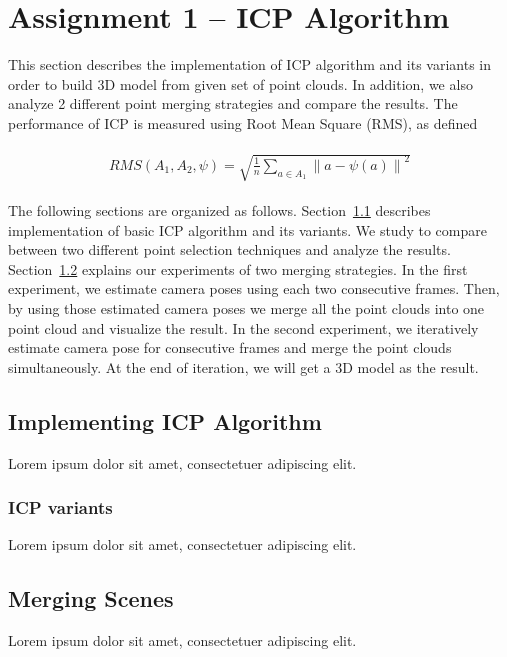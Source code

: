 \documentclass{article}
\begin{document}
\section{Assignment 1 -- ICP Algorithm}
\label{sec:assignment1}

This section describes the implementation of ICP algorithm and its variants in order to build 3D model from given set of point clouds. In addition, we also analyze 2 different point merging strategies and compare the results. The performance of ICP is measured using Root Mean Square (RMS), as defined

\begin{align} 
\begin{split}
RMS(A_{1},A_{2},\psi) = \sqrt{\frac{1}{n}\sum_{a \in A_{1}}^{} \left \| a - \psi (a) \right \|^{2}}
\end{split}					
\end{align}

The following sections are organized as follows. Section~\ref{subsec:basic_icp} describes implementation of basic ICP algorithm and its variants. We study to compare between two different point selection techniques and analyze the results. Section~\ref{subsec:merging_scenes} explains our experiments of two merging strategies. In the first experiment, we estimate camera poses using each two consecutive frames. Then, by using those estimated camera poses we merge all the point clouds into one point cloud and visualize the result. In the second experiment, we iteratively estimate camera pose for consecutive frames and merge the point clouds simultaneously. At the end of iteration, we will get a 3D model as the result.

\subsection{Implementing ICP Algorithm}
\label{subsec:basic_icp}

Lorem ipsum dolor sit amet, consectetuer adipiscing elit. 

\subsubsection{ICP variants}

Lorem ipsum dolor sit amet, consectetuer adipiscing elit. 

\subsection{Merging Scenes}
\label{subsec:merging_scenes}

Lorem ipsum dolor sit amet, consectetuer adipiscing elit. 
\end{document}
